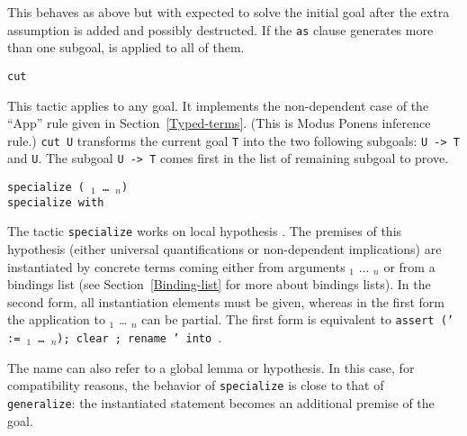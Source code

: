 \begin{coq_example*}
\begin{Variants}
  This behaves as above but with {\tac} expected to solve the initial
  goal after the extra assumption {\form} is added and possibly
  destructed. If the \texttt{as} {\intropattern} clause generates more
  than one subgoal, {\tac} is applied to all of them.

\item {\tt cut {\form}}

  This tactic applies to any goal. It implements the non-dependent
  case of the ``App'' rule given in
  Section~\ref{Typed-terms}. (This is Modus Ponens inference rule.)
  {\tt cut U} transforms the current goal \texttt{T} into the two
  following subgoals: {\tt U -> T} and \texttt{U}.  The subgoal {\tt U
    -> T} comes first in the list of remaining subgoal to prove.

\item {\tt specialize ({\ident} \term$_1$ \dots\ \term$_n$)} \\
      {\tt specialize {\ident} with \bindinglist}

      The tactic {\tt specialize} works on local hypothesis \ident.
      The premises of this hypothesis (either universal
      quantifications or non-dependent implications) are instantiated
      by concrete terms coming either from arguments \term$_1$
      $\ldots$ \term$_n$ or from a bindings list (see
      Section~\ref{Binding-list} for more about bindings lists). In the
      second form, all instantiation elements must be given, whereas
      in the first form the application to \term$_1$ {\ldots}
      \term$_n$ can be partial. The first form is equivalent to
      {\tt assert (\ident' := {\ident} {\term$_1$} \dots\ \term$_n$);
           clear \ident; rename \ident' into \ident}.

      The name {\ident} can also refer to a global lemma or
      hypothesis. In this case, for compatibility reasons, the
      behavior of {\tt specialize} is close to that of {\tt
        generalize}: the instantiated statement becomes an additional
      premise of the goal.

  \begin{ErrMsgs}
  \item {}
  \item {}
  \end{ErrMsgs}



\end{Variants}
\end{coq_example*}

